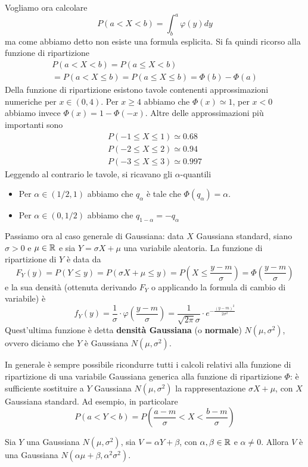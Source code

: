 Vogliamo ora calcolare
\[ P(a < X < b) = \int_b^a \varphi (y) dy \]
ma come abbiamo detto non esiste una formula esplicita. Si fa quindi ricorso alla funzione di
ripartizione
\begin{multline*}
	P(a < X < b) = P(a \leq X < b) \\
	= P(a < X \leq b) = P(a \leq X \leq b) = \Phi(b) - \Phi(a)
\end{multline*}
Della funzione di ripartizione esistono tavole contenenti approssimazioni numeriche per
$x \in (0,4)$. Per $x \geq 4$ abbiamo che $\Phi(x) \simeq 1$, per $x < 0$ abbiamo invece
$\Phi(x) = 1 - \Phi(-x)$. Altre delle approssimazioni più importanti sono
\begin{gather*}
	P(-1 \leq X \leq 1) \simeq 0.68 \\
	P(-2 \leq X \leq 2) \simeq 0.94 \\
	P(-3 \leq X \leq 3) \simeq 0.997
\end{gather*}
Leggendo al contrario le tavole, si ricavano gli $\alpha$-quantili
\begin{itemize}
	\item Per $\alpha \in (1/2, 1)$ abbiamo che $q_\alpha$ è tale che $\Phi(q_\alpha) = \alpha$.
	\item Per $\alpha \in (0, 1/2)$ abbiamo che $q_{1-\alpha} = -q_\alpha$
\end{itemize}
Passiamo ora al caso generale di Gaussiana: data $X$ Gaussiana standard, siano $\sigma > 0$ e
$\mu \in \mathbb{R}$ e sia $Y = \sigma X + \mu$ una variabile aleatoria. La funzione di ripartizione di
$Y$ è data da
\[
	F_Y(y) = P(Y \leq y) = P(\sigma X + \mu \leq y)
	= P\left(X \leq \frac{y - m}{\sigma}\right)
	= \Phi \left(\frac{y - m}{\sigma}\right)
\]
e la sua densità (ottenuta derivando $F_Y$ o applicando la formula di cambio di variabile) è
\[
	f_Y(y) = \frac{1}{\sigma} \cdot \varphi \left(\frac{y - m}{\sigma}\right) =
	\frac{1}{\sqrt{2 \pi} \sigma} \cdot e^{-\frac{(y - m)^2}{2 \sigma^2}}
\]
Quest'ultima funzione è detta \textbf{densità Gaussiana} (o \textbf{normale}) $N(\mu, \sigma^2)$,
ovvero diciamo che $Y$ è Gaussiana $N(\mu, \sigma^2)$.

In generale è sempre possibile ricondurre tutti i calcoli relativi alla funzione di ripartizione
di una variabile Gaussiana generica alla funzione di ripartizione $\Phi$: è sufficiente sostituire
a $Y$ Gaussiana $N(\mu, \sigma^2)$ la rappresentazione $\sigma X + \mu$, con $X$ Gaussiana
standard. Ad esempio, in particolare
\[ P(a < Y < b) = P \left( \frac{a-m}{\sigma} < X < \frac{b-m}{\sigma} \right) \]

\begin{theorem}[Riproducibilità]\label{th: riprod_gauss}
	Sia $Y$ una Gaussiana $N(\mu, \sigma^2)$, sia $V = \alpha Y + \beta$, con
	$\alpha, \beta \in \mathbb{R}$ e $\alpha \neq 0$. Allora $V$ è una Gaussiana
	$N(\alpha \mu + \beta, \alpha^2 \sigma^2)$.
\end{theorem}